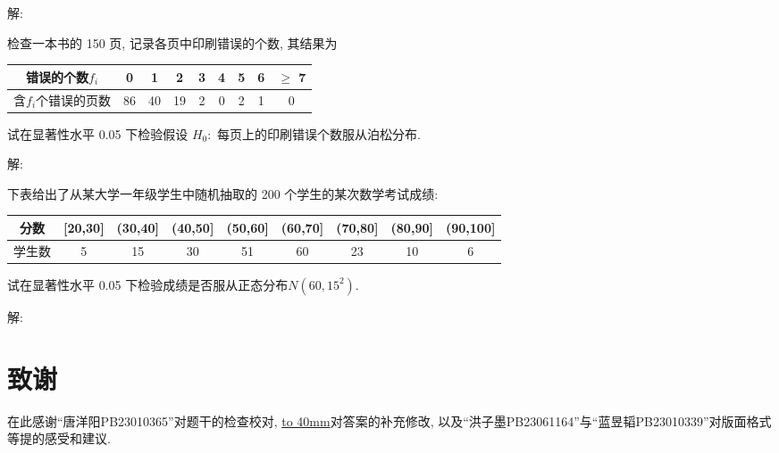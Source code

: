 \documentclass[standard]{ExBook}
\begin{document}
\begin{qitems}
    \begin{bbox}
解: 
    \end{bbox}

\vspace{-5em}

    \begin{bbox}
    \begin{shaded}
        \qitem
检查一本书的 150 页, 记录各页中印刷错误的个数, 其结果为
\begin{center}
\setlength{\tabcolsep}{17pt}
\begin{tabular}{c|cccccccc}
\hline
错误的个数$f_i$ & 0 & 1 & 2 & 3 & 4 & 5 & 6 & $\geq$ 7 \\
\hline
含$f_i$个错误的页数 & 86 & 40 & 19 & 2 & 0 & 2 & 1 & 0 \\
\hline
\end{tabular}
\end{center}
试在显著性水平 0.05 下检验假设 $H_0 : $ 每页上的印刷错误个数服从泊松分布.
    \end{shaded}
    \end{bbox}

\vspace{-5em}

    \begin{bbox}
解: 
    \end{bbox}

\vspace{-5em}

    \begin{bbox}
    \begin{shaded}
        \qitem
下表给出了从某大学一年级学生中随机抽取的 200 个学生的某次数学考试成绩:
\begin{center}
\setlength{\tabcolsep}{9pt}
\begin{tabular}{c|cccccccc}
\hline
分数 & [20,30] & (30,40] & (40,50] & (50,60] & (60,70] & (70,80] & (80,90] & (90,100] \\
\hline
学生数 & 5 & 15 & 30 & 51 & 60 & 23 & 10 & 6 \\
\hline
\end{tabular}
\end{center}
试在显著性水平 0.05 下检验成绩是否服从正态分布$N(60,15^2)$.
    \end{shaded}
    \end{bbox}

\vspace{-5em}

    \begin{bbox}
解: 
    \end{bbox}
\end{qitems}


\section*{致谢}

在此感谢``唐洋阳PB23010365''对题干的检查校对, \underline{\hbox to 40mm{}}对答案的补充修改, 以及``洪子墨PB23061164''与``蓝昱韬PB23010339''对版面格式等提的感受和建议.
\end{document}
